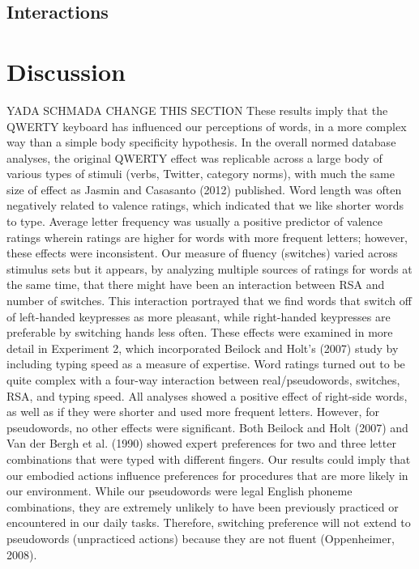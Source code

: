 \documentclass[english,man]{apa6}
\theoremstyle{definition}
\theoremstyle{definition}
\theoremstyle{definition}
\theoremstyle{remark}
\begin{document}
\subsection{Interactions}\label{interactions-1}

\section{Discussion}\label{discussion}

YADA SCHMADA CHANGE THIS SECTION These results imply that the QWERTY
keyboard has influenced our perceptions of words, in a more complex way
than a simple body specificity hypothesis. In the overall normed
database analyses, the original QWERTY effect was replicable across a
large body of various types of stimuli (verbs, Twitter, category norms),
with much the same size of effect as Jasmin and Casasanto (2012)
published. Word length was often negatively related to valence ratings,
which indicated that we like shorter words to type. Average letter
frequency was usually a positive predictor of valence ratings wherein
ratings are higher for words with more frequent letters; however, these
effects were inconsistent. Our measure of fluency (switches) varied
across stimulus sets but it appears, by analyzing multiple sources of
ratings for words at the same time, that there might have been an
interaction between RSA and number of switches. This interaction
portrayed that we find words that switch off of left-handed keypresses
as more pleasant, while right-handed keypresses are preferable by
switching hands less often. These effects were examined in more detail
in Experiment 2, which incorporated Beilock and Holt's (2007) study by
including typing speed as a measure of expertise. Word ratings turned
out to be quite complex with a four-way interaction between
real/pseudowords, switches, RSA, and typing speed. All analyses showed a
positive effect of right-side words, as well as if they were shorter and
used more frequent letters. However, for pseudowords, no other effects
were significant. Both Beilock and Holt (2007) and Van der Bergh et al.
(1990) showed expert preferences for two and three letter combinations
that were typed with different fingers. Our results could imply that our
embodied actions influence preferences for procedures that are more
likely in our environment. While our pseudowords were legal English
phoneme combinations, they are extremely unlikely to have been
previously practiced or encountered in our daily tasks. Therefore,
switching preference will not extend to pseudowords (unpracticed
actions) because they are not fluent (Oppenheimer, 2008).
\end{document}
